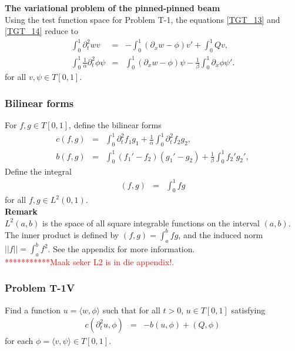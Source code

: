 \documentclass[../../main.tex]{subfiles}
\begin{document}
\textbf{The variational problem of the pinned-pinned beam}\\

Using the test function space for Problem T-1, the equations \eqref{TGT_13} and \eqref{TGT_14} reduce to
\begin{eqnarray}
	\int_{0}^{1} \partial_{t}^{2} w v &=& -\int_{0}^{1}(\partial_x w - \phi) v' + \int_{0}^{1} Q v, \label{eq:1D_Model:ProblemT1V1}\\
	\int_{0}^{1}\frac{1}{\alpha} \partial_{t}^{2} \phi \psi &=&   \int_{0}^{1} (\partial_x w -\phi) \psi - \frac{1}{\beta} \int_{0}^{1}\partial_x \phi \psi'.\label{eq:1D_Model:ProblemT1V2}
\end{eqnarray}
for all $v, \psi \in T[0,1]$.

\subsubsection{Bilinear forms}
For $f,g \in T[0,1]$, define the bilinear forms
\begin{eqnarray}
	c(f,g) & = & \int_0^1  \partial_t^2 f_1 g_1 + \frac{1}{\alpha}\int_0^1  \partial_t^2 f_2g_2, \label{eq:1D_Model:Bilinear} \\ 
	b(f,g) & = &   \int_0^1 (f_1'-f_2)(g_1' - g_2) + \frac{1}{\beta}\int_0^1  f_2' g_2', \label{eq:1D_Model:Bilinear_c}
\end{eqnarray}
Define the integral
\begin{eqnarray}
	(f,g) &=& \int_{0}^1 fg \label{eq:1D_Model:Bilinear_int}
\end{eqnarray} for all $f,g \in L^2(0,1).$\\

\textbf{Remark}\\
$L^2(a,b)$ is the space of all square integrable functions on the interval $(a,b)$. The inner product is defined by $\displaystyle (f,g) = \int_a^b fg$, and the induced norm $\displaystyle ||f|| = \int_a^b f^2$. See the appendix for more information.\\


\textcolor{red}{***********Maak seker L2 is in die appendix!.}\\

\subsubsection*{Problem T-1V}\label{sssec:1D_Model:ProblemT1V}
Find a function ${u} = \langle w, \phi \rangle$ such that for all $t >0$, ${u} \in  T[0,1]$ satisfying
\begin{eqnarray}
	c(\partial_t^2 u,{\phi}) &=& -b({u},{\phi}) + (Q,{\phi})
\end{eqnarray} for each ${\phi} = \langle v, \psi \rangle \in T[0,1]$. \\
\end{document}
